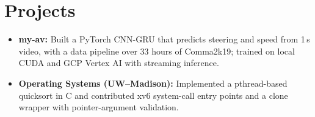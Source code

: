 \documentclass[11pt, letterpaper]{article}
\begin{document}
\section{Projects}
\begin{itemize}
  \item \textbf{my-av:} Built a PyTorch CNN-GRU that predicts steering and speed from 1\,s video, with a data pipeline over 33 hours of Comma2k19; trained on local CUDA and GCP Vertex AI with streaming inference.
  \item \textbf{Operating Systems (UW--Madison):} Implemented a pthread-based quicksort in C and contributed xv6 system-call entry points and a clone wrapper with pointer-argument validation.
\end{itemize}
\end{document}
